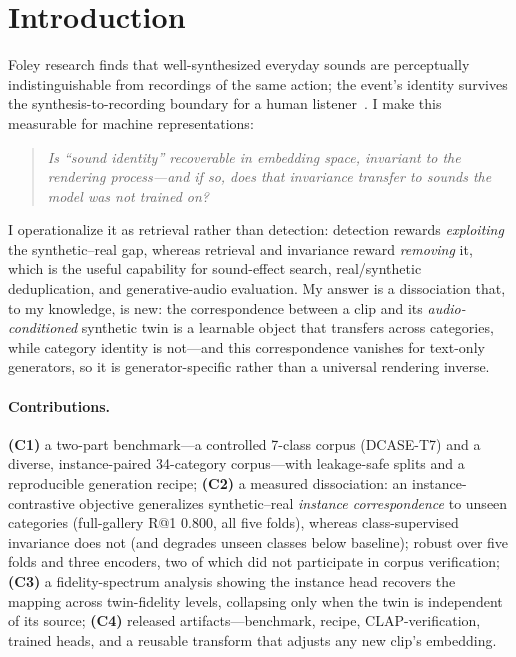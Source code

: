 \documentclass{article}
\begin{document}
\section{Introduction}
Foley research finds that well-synthesized everyday sounds are perceptually indistinguishable from
recordings of the same action; the event's identity survives the synthesis-to-recording boundary
for a human listener~\citep{nordahl2010walking}. I make this measurable for machine
representations:
\begin{quote}
\emph{Is ``sound identity'' recoverable in embedding space, invariant to the rendering process---and
if so, does that invariance transfer to sounds the model was not trained on?}
\end{quote}
I operationalize it as retrieval rather than detection: detection rewards \emph{exploiting} the
synthetic--real gap, whereas retrieval and invariance reward \emph{removing} it, which is the useful
capability for sound-effect search, real/synthetic deduplication, and generative-audio evaluation.
My answer is a dissociation that, to my knowledge, is new: the correspondence between a clip and
its \emph{audio-conditioned} synthetic twin is a learnable object that transfers across categories,
while category identity is not---and this correspondence vanishes for text-only generators, so it
is generator-specific rather than a universal rendering inverse.

\paragraph{Contributions.}
\textbf{(C1)} a two-part benchmark---a controlled 7-class corpus (DCASE-T7) and a diverse,
instance-paired 34-category corpus---with leakage-safe splits and a reproducible generation recipe;
\textbf{(C2)} a measured dissociation: an instance-contrastive objective generalizes synthetic--real
\emph{instance correspondence} to unseen categories (full-gallery R@1 $0.800$, all five folds),
whereas class-supervised invariance does not (and degrades unseen classes below baseline);
robust over five folds and three encoders, two of which did not participate in corpus verification;
\textbf{(C3)} a fidelity-spectrum analysis showing the instance head recovers the mapping across
twin-fidelity levels, collapsing only when the twin is independent of its source;
\textbf{(C4)} released artifacts---benchmark, recipe, CLAP-verification, trained heads, and a
reusable transform that adjusts any new clip's embedding.
\end{document}
